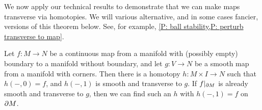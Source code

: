 We now apply our technical results to demonstrate that we can make maps transverse via homotopies. 
We will various alternative, and in some cases fancier, versions of this theorem below.
See, for example, \cref{P: ball stability,P: perturb transverse to map}.

\begin{theorem}\label{T: basic trans}
	Let $f \colon M \to N$ be a continuous map from a manifold with (possibly empty) boundary to a manifold without boundary, and let $g \colon V \to N$ be a smooth map from a manifold with corners.
	Then there is a homotopy $h \colon M \times I \to N$ such that $h(-,0) = f$, and $h(-,1)$ is smooth and transverse to $g$.
	If $f|_{\partial M}$ is already smooth and transverse to $g$, then we can find such an $h$ with $h(-,1) = f$ on $\partial M$.
\end{theorem}

